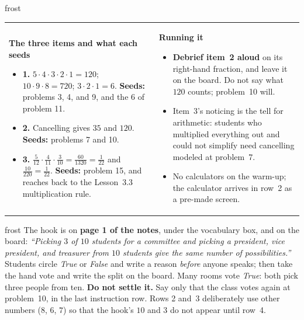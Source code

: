 \documentclass[10pt]{article}
\begin{document}
\begin{fixedskillbox}{frost}
\begin{tabularx}{\linewidth}{@{}X X@{}}
\begin{minipage}[t]{\linewidth}\vspace{0pt}
    \textbf{The three items and what each seeds}
    \begin{itemize}[leftmargin=1.1em, itemsep=1pt, topsep=2pt]
      \item \textbf{1.} $5 \cdot 4 \cdot 3 \cdot 2 \cdot 1 = 120$; $10 \cdot 9 \cdot 8 = 720$;
            $3 \cdot 2 \cdot 1 = 6$. \textbf{Seeds:} problems 3, 4, and 9, and the $6$ of
            problem 11.
      \item \textbf{2.} Cancelling gives $35$ and $120$. \textbf{Seeds:} problems 7 and 10.
      \item \textbf{3.} $\frac{5}{12} \cdot \frac{4}{11} \cdot \frac{3}{10} = \frac{60}{1320} =
            \frac{1}{22}$ and $\frac{10}{220} = \frac{1}{22}$. \textbf{Seeds:} problem 15, and
            reaches back to the Lesson~3.3 multiplication rule.
    \end{itemize}
\end{minipage}
&
\begin{minipage}[t]{\linewidth}\vspace{0pt}
    \textbf{Running it}
    \begin{itemize}[leftmargin=1.1em, itemsep=1pt, topsep=2pt]
      \item \textbf{Debrief item~2 aloud} on its right-hand fraction, and leave it on the
            board. Do not say what $120$ counts; problem~10 will.
      \item Item~3's noticing is the tell for arithmetic: students who multiplied everything
            out and could not simplify need cancelling modeled at problem~7.
      \item No calculators on the warm-up; the calculator arrives in row~2 as a pre-made
            screen.
    \end{itemize}
\end{minipage}
\end{tabularx}
\end{fixedskillbox}

\boxguard
\begin{skillbox}{frost}
The hook is on \textbf{page 1 of the notes}, under the vocabulary box, and on the board:
\textit{``Picking $3$ of $10$ students for a committee and picking a president, vice president,
and treasurer from $10$ students give the same number of possibilities.''} Students circle
\emph{True} or \emph{False} and write a reason \emph{before} anyone speaks; then take the hand
vote and write the split on the board. Many rooms vote \emph{True}: both pick three people from
ten. \textbf{Do not settle it.} Say only that the class votes again at problem~10, in the last
instruction row. Rows 2 and~3 deliberately use other numbers ($8$, $6$, $7$) so that the hook's
$10$ and $3$ do not appear until row~4.
\end{skillbox}
\end{document}
